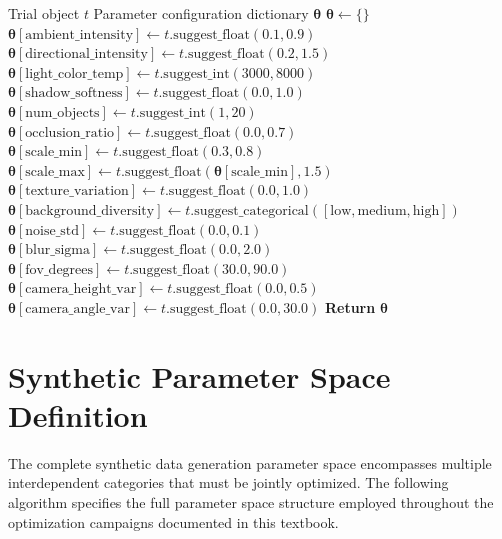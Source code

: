 \begin{algorithm}[H]
\caption{Synthetic Parameter Sampling}
\label{alg:sample_params}
\begin{algorithmic}[1]
\Require Trial object $t$
\Ensure Parameter configuration dictionary $\boldsymbol{\theta}$
\State $\boldsymbol{\theta} \gets \{\}$
\State {}
\State $\boldsymbol{\theta}[\text{ambient\_intensity}] \gets t.\text{suggest\_float}(0.1, 0.9)$
\State $\boldsymbol{\theta}[\text{directional\_intensity}] \gets t.\text{suggest\_float}(0.2, 1.5)$
\State $\boldsymbol{\theta}[\text{light\_color\_temp}] \gets t.\text{suggest\_int}(3000, 8000)$
\State $\boldsymbol{\theta}[\text{shadow\_softness}] \gets t.\text{suggest\_float}(0.0, 1.0)$
\State {}
\State $\boldsymbol{\theta}[\text{num\_objects}] \gets t.\text{suggest\_int}(1, 20)$
\State $\boldsymbol{\theta}[\text{occlusion\_ratio}] \gets t.\text{suggest\_float}(0.0, 0.7)$
\State $\boldsymbol{\theta}[\text{scale\_min}] \gets t.\text{suggest\_float}(0.3, 0.8)$
\State $\boldsymbol{\theta}[\text{scale\_max}] \gets t.\text{suggest\_float}(\boldsymbol{\theta}[\text{scale\_min}], 1.5)$
\State {}
\State $\boldsymbol{\theta}[\text{texture\_variation}] \gets t.\text{suggest\_float}(0.0, 1.0)$
\State $\boldsymbol{\theta}[\text{background\_diversity}] \gets t.\text{suggest\_categorical}([\text{low}, \text{medium}, \text{high}])$
\State $\boldsymbol{\theta}[\text{noise\_std}] \gets t.\text{suggest\_float}(0.0, 0.1)$
\State $\boldsymbol{\theta}[\text{blur\_sigma}] \gets t.\text{suggest\_float}(0.0, 2.0)$
\State {}
\State $\boldsymbol{\theta}[\text{fov\_degrees}] \gets t.\text{suggest\_float}(30.0, 90.0)$
\State $\boldsymbol{\theta}[\text{camera\_height\_var}] \gets t.\text{suggest\_float}(0.0, 0.5)$
\State $\boldsymbol{\theta}[\text{camera\_angle\_var}] \gets t.\text{suggest\_float}(0.0, 30.0)$
\State \textbf{Return} $\boldsymbol{\theta}$
\end{algorithmic}
\end{algorithm}

\section{Synthetic Parameter Space Definition}
\label{sec:param_space}

The complete synthetic data generation parameter space encompasses multiple interdependent categories that must be jointly optimized. The following algorithm specifies the full parameter space structure employed throughout the optimization campaigns documented in this textbook.

